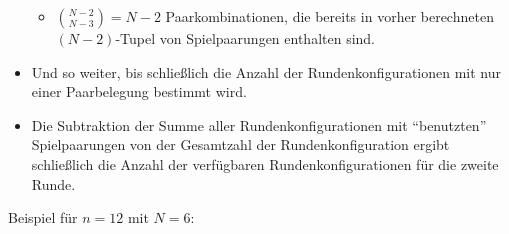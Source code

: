 \documentclass[DIV=15, 10pt]{scrartcl}
\begin{document}
\begin{itemize}
\begin{itemize}
\item ${{N-2}\choose{N-3}} = N-2$ Paarkombinationen, die bereits in vorher berechneten $(N-2)$-Tupel von Spielpaarungen enthalten sind.
\end{itemize}

\item Und so weiter, bis schließlich die Anzahl der Rundenkonfigurationen mit nur einer Paarbelegung bestimmt wird.

\item Die Subtraktion der Summe aller Rundenkonfigurationen mit "`benutzten"' Spielpaarungen von der Gesamtzahl der Rundenkonfiguration ergibt schließlich die Anzahl der verfügbaren Rundenkonfigurationen für die zweite Runde.

\end{itemize}

Beispiel für $n=12$ mit $N=6$:
\end{document}
